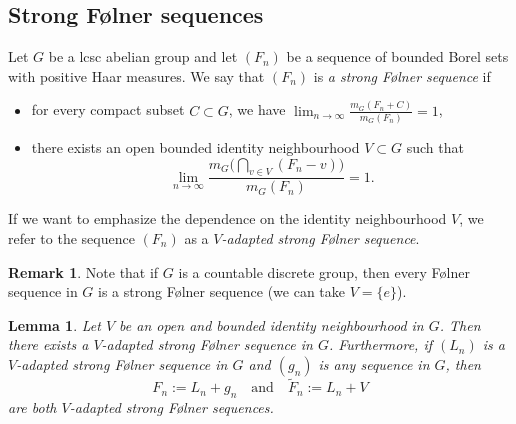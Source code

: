 \documentclass[12pt,reqno,a4paper]{amsart}
\numberwithin{equation}{section}
\newcommand{\ra}{\rightarrow}
\newcommand{\qand}{\quad \textrm{and} \quad}
\theoremstyle{theorem}
\newtheorem{lemma}[theorem]{Lemma}
\theoremstyle{task}
\theoremstyle{definition}
\newtheorem{remark}[theorem]{Remark}
\begin{document}
\subsection{Strong F\o lner sequences}
\label{Subsec:Folner}
Let $G$ be a lcsc abelian group and let $(F_n)$ be a sequence of bounded Borel sets with positive Haar measures. We say that $(F_n)$ is \emph{a strong F\o lner sequence} if
\vspace{0.1cm}
\begin{itemize}
\item[(i)] for every compact subset $C \subset G$, we have $\lim_{n \ra \infty} \frac{m_G(F_n+C)}{m_G(F_n)} = 1$, \vspace{0.2cm}
\item[(ii)] there exists an open bounded identity neighbourhood $V \subset G$ such that
\[
\lim_{n \ra \infty} \frac{m_G\big( \bigcap_{v \in V} (F_n-v) \big)}{m_G(F_n)} = 1.
\]
\end{itemize} 
If we want to emphasize the dependence on the identity neighbourhood $V$, we refer to 
the sequence $(F_n)$ as a \emph{$V$-adapted strong F\o lner sequence}.

\begin{remark}
Note that if $G$ is a countable discrete group, then every F\o lner sequence in $G$
is a strong F\o lner sequence (we can take $V = \{e\}$).
\end{remark}

\begin{lemma}
\label{Lemma_Folner}
Let $V$ be an open and bounded identity neighbourhood in $G$. Then there 
exists a $V$-adapted strong F\o lner sequence in $G$. Furthermore, if $(L_n)$ is a 
$V$-adapted strong F\o lner sequence in $G$ and $(g_n)$
is any sequence in $G$, then 
\[
F_n := L_n + g_n \qand \widetilde{F}_n := L_n + V 
\]
are both $V$-adapted strong F\o lner sequences.
\end{lemma}
\end{document}
